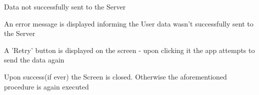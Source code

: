 \begin{packed_item}
\begin{packed_item}
					\item[4.a] Data not successfully sent to the Server
					\item[] \begin{packed_enum}
						\item An error message is displayed informing the User data wasn't successfully sent to the Server
						\item A 'Retry' button is displayed on the screen - upon clicking it the app attempts to send the data again
						\item Upon success(if ever) the Screen is closed. Otherwise the aforementioned procedure is again executed
					\end{packed_enum}
				\end{packed_item}
			\end{packed_item}
			
